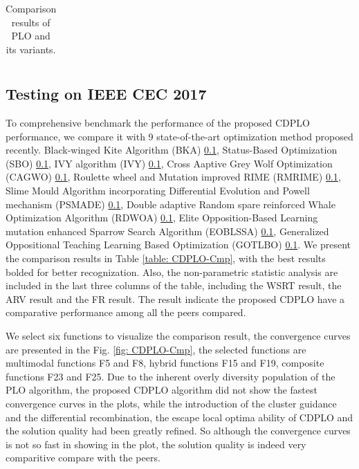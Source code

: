 \documentclass[3p]{elsarticle}
\begin{document}
\begin{table}
\centering
\caption{Comparison results of PLO and its variants.}
\label{table: CDPLO-Ablation}
\begin{tabular}{@{}lcccccccccccccccc@{}}
\end{tabular}
\end{table}

\subsection{Testing on IEEE CEC 2017}
To comprehensive benchmark the performance of the proposed CDPLO performance, we compare it with 9 state-of-the-art optimization method proposed recently. Black-winged Kite Algorithm (BKA) \ref{}, Status-Based Optimization (SBO) \ref{}, IVY algorithm (IVY) \ref{}, Cross Aaptive Grey Wolf Optimization (CAGWO) \ref{}, Roulette wheel and Mutation improved RIME (RMRIME) \ref{}, Slime Mould Algorithm incorporating Differential Evolution and Powell mechanism (PSMADE) \ref{}, Double adaptive Random spare reinforced Whale Optimization Algorithm (RDWOA) \ref{}, Elite Opposition-Based Learning mutation enhanced Sparrow Search Algorithm (EOBLSSA) \ref{}, Generalized Oppositional Teaching Learning Based Optimization (GOTLBO) \ref{}. We present the comparison results in Table \ref{table: CDPLO-Cmp}, with the best results bolded for better recognization. Also, the non-parametric statistic analysis are included in the last three columns of the table, including the WSRT result, the ARV result and the FR result. The result indicate the proposed CDPLO have a comparative performance among all the peers compared.

We select six functions to visualize the comparison result, the convergence curves are presented in the Fig. \ref{fig: CDPLO-Cmp}, the selected functions are multimodal functions F5 and F8, hybrid functions F15 and F19, composite functions F23 and F25. Due to the inherent overly diversity population of the PLO algorithm, the proposed CDPLO algorithm did not show the fastest convergence curves in the plots, while the introduction of the cluster guidance and the differential recombination, the escape local optima ability of CDPLO and the solution quality had been greatly refined. So although the convergence curves is not so fast in showing in the plot, the solution quality is indeed very comparitive compare with the peers.
\end{document}

